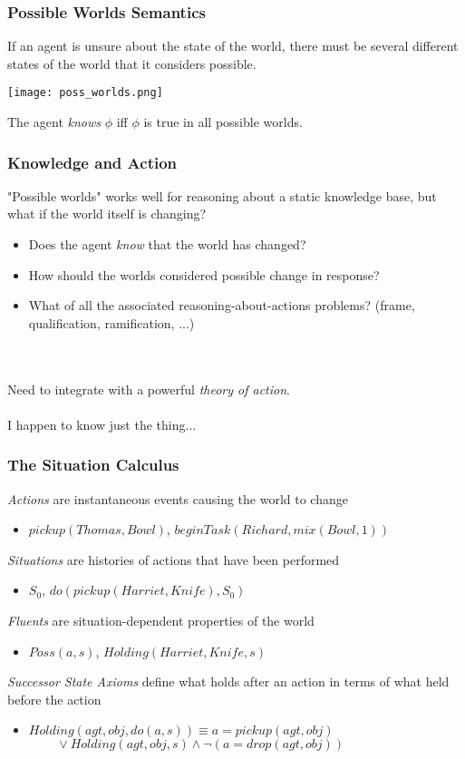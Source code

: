 \documentclass{beamer}
\begin{document}
\begin{frame}
\frametitle{Possible Worlds Semantics}

If an agent is unsure about the state of the world, there must be several
different states of the world that it considers possible.

\begin{center}
  \texttt{[image: poss\_worlds.png]}
\end{center}

The agent \emph{knows} $\phi$ iff $\phi$ is true in all possible worlds.

\end{frame}

\begin{frame}
\frametitle{Knowledge and Action}
"Possible worlds" works well for reasoning about a static knowledge base,
but what if the world itself is changing?
\begin{itemize}
\item  Does the agent \emph{know} that the world has changed?
\item  How should the worlds considered possible change in response?
\item  What of all the associated reasoning-about-actions problems? (frame, qualification, ramification, ...)
\end{itemize}
\ \\
\ \\
Need to integrate with a powerful \emph{theory of action}.
\pause
\ \\
\ \\
I happen to know just the thing...
\end{frame}

\begin{frame}
\frametitle{The Situation Calculus}
\emph{Actions} are instantaneous events causing the world to change
\begin{itemize}
  \item $pickup(Thomas,Bowl)$, $beginTask(Richard,mix(Bowl,1))$
\end{itemize}
\emph{Situations} are histories of actions that have been performed
\begin{itemize}
  \item $S_0$, $do(pickup(Harriet,Knife),S_0)$
\end{itemize}
\emph{Fluents} are situation-dependent properties of the world
\begin{itemize}
  \item $Poss(a,s)$, $Holding(Harriet,Knife,s)$
\end{itemize}
\emph{Successor State Axioms} define what holds after an action in terms of what held before the action
\begin{itemize}
  \item $Holding(agt,obj,do(a,s)) \equiv a = pickup(agt,obj)$ \\
        $\,\,\,\,\,\,\,\,\,\,\,\,\,\vee Holding(agt,obj,s) \wedge \neg\left(a = drop(agt,obj)\right)$
\end{itemize}
\end{frame}
\end{document}
